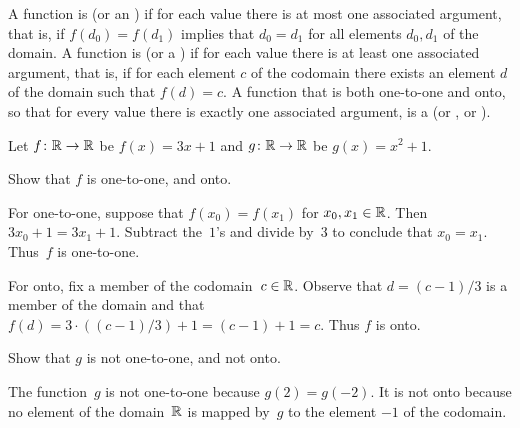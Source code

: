 \documentclass{ibl}  %
\begin{document}
\begin{df}
A function is  (or an ) 
if for each value there is at most
one associated argument, that is, if $f(d_0)=f(d_1)$ implies that $d_0=d_1$
for all elements $d_0,d_1$ of the domain.
A function is  (or a ) 
if for each value there is at least
one associated argument, that is, if for each element $c$ of the codomain
there exists an element $d$ of the domain such that $f(d)=c$.
A function that is both one-to-one and onto, so that for every value there
is exactly one associated argument, is a 
 (or , or ).
\end{df}

\begin{problem} 
  Let $\mbox{$f\colon \mathbb{R}\to \mathbb{R}$}$ be $f(x)=3x+1$ and 
  $\mbox{$g\colon \mathbb{R}\to \mathbb{R}$}$ be $g(x)=x^2+1$.
\begin{exes}
\begin{exercise} 
  Show that $f$ is one-to-one, and onto.
\end{exercise}
\begin{answer}
  For one-to-one, suppose that $f(x_0)=f(x_1)$ for $x_0,x_1\in\mathbb{R}$.
  Then $3x_0+1=3x_1+1$.
  Subtract the~$1$'s and divide by~$3$ to conclude that $x_0=x_1$.
  Thus~$f$ is one-to-one.   

  For onto, fix a member of the codomain~$c\in\mathbb{R}$.
  Observe that $d=(c-1)/3$ is a member of the domain and that 
  $f(d)=3\cdot ((c-1)/3)+1=(c-1)+1=c$.
  Thus $f$ is onto.  
\end{answer}
\begin{exercise} 
  Show that $g$ is not one-to-one, and not onto.
\end{exercise}
\begin{answer}
  The function~$g$ is not one-to-one because $g(2)=g(-2)$.
  It is not onto because no element of the domain~$\mathbb{R}$ is mapped by~$g$
  to the element $-1$ of the codomain.          
\end{answer}
\end{exes}
\end{problem}
\end{document}
